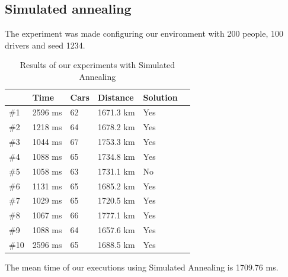 \documentclass[12]{article}
\begin{document}
\subsection{Simulated annealing}
The experiment was made configuring our environment with 200 people, 100 drivers and seed 1234.
\\


\begin{table}[h]
\centering
\begin{tabular}{|l|l|l|l|l|l|}
\hline & \textbf{Time}  & \textbf{Cars} & \textbf{Distance} & \textbf{Solution}\\  \hline
 \#1 & 2596 ms  & 62 & 1671.3 km & Yes \\ \hline
 \#2 & 1218 ms & 64 & 1678.2 km & Yes \\ \hline
  \#3 & 1044 ms & 67 & 1753.3 km & Yes \\ \hline
 \#4 & 1088 ms & 65 & 1734.8 km & Yes \\ \hline
 \#5 & 1058 ms & 63 & 1731.1 km & No \\ \hline
 \#6 & 1131 ms & 65 & 1685.2 km & Yes \\ \hline
 \#7 & 1029 ms & 65 & 1720.5 km & Yes \\ \hline
 \#8 & 1067 ms & 66 & 1777.1 km & Yes \\ \hline
 \#9 & 1088 ms & 64 & 1657.6 km & Yes\\ \hline
 \#10 & 2596 ms & 65 & 1688.5 km & Yes \\ \hline

\end{tabular}
\caption{Results of our experiments with Simulated Annealing}
\label{Results2}
\end{table}

The mean time of our executions using Simulated Annealing is 1709.76 ms. 
\end{document}

